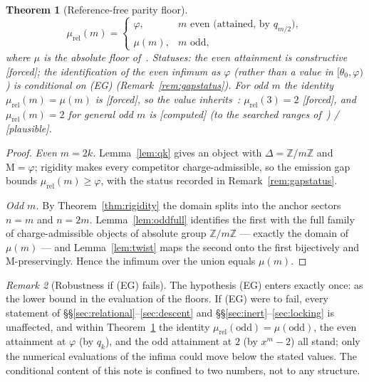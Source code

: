 \documentclass[11pt]{article}
\theoremstyle{plain}
\newtheorem{theorem}{Theorem}[section]
\theoremstyle{definition}
\theoremstyle{remark}
\newtheorem{remark}[theorem]{Remark}
\newcommand{\Z}{\mathbb{Z}}
\newcommand{\Mah}{\mathrm{M}}
\newcommand{\F}{\textnormal{[forced]}}
\newcommand{\C}{\textnormal{[computed]}}
\newcommand{\Pl}{\textnormal{[plausible]}}
\begin{document}
\begin{theorem}[Reference-free parity floor]\label{thm:parityrel}
\[
\mu_{\mathrm{rel}}(m)=
\begin{cases}
\varphi, & m\text{ even (attained, by }q_{m/2}\text{)},\\[2pt]
\mu(m), & m\text{ odd,}
\end{cases}
\]
where $\mu$ is the absolute floor of~\cite[Thm.~5.1]{CMC}. Statuses: the even
attainment is constructive \F; the identification of the even infimum as
$\varphi$ (rather than a value in $[\theta_0,\varphi)$) is conditional on
\textup{(EG)} (Remark~\ref{rem:gapstatus}). For odd
$m$ the identity
$\mu_{\mathrm{rel}}(m)=\mu(m)$ is \F, so the value inherits~\cite{CMC}:
$\mu_{\mathrm{rel}}(3)=2$ \F, and $\mu_{\mathrm{rel}}(m)=2$ for general odd $m$
is \C{} (to the searched ranges of~\cite[\S6]{CMC}) / \Pl.
\end{theorem}

\begin{proof}
\emph{Even $m=2k$.} Lemma~\ref{lem:qk} gives an object with $\Delta=\Z/m\Z$ and
$\Mah=\varphi$; rigidity makes every competitor charge-admissible, so the
emission gap bounds $\mu_{\mathrm{rel}}(m)\ge\varphi$, with the status
recorded in Remark~\ref{rem:gapstatus}.

\emph{Odd $m$.} By Theorem~\ref{thm:rigidity} the domain splits into the anchor
sectors $n=m$ and $n=2m$. Lemma~\ref{lem:oddfull} identifies the first with the
full family of charge-admissible objects of absolute group $\Z/m\Z$ --- exactly
the domain of $\mu(m)$ --- and Lemma~\ref{lem:twist} maps the second onto the
first bijectively and $\Mah$-preservingly. Hence the infimum over the union
equals $\mu(m)$.
\end{proof}

\begin{remark}[Robustness if \textup{(EG)} fails]\label{rem:robust}
The hypothesis \textup{(EG)} enters exactly once: as the lower bound in the
evaluation of the floors. If \textup{(EG)} were to fail, every statement of
\S\S\ref{sec:relational}--\ref{sec:descent} and
\S\S\ref{sec:inert}--\ref{sec:locking} is unaffected, and within
Theorem~\ref{thm:parityrel} the identity
$\mu_{\mathrm{rel}}(\text{odd})=\mu(\text{odd})$, the even attainment at
$\varphi$ (by $q_k$), and the odd attainment at $2$ (by $x^m-2$) all stand;
only the numerical evaluations of the infima could move below the stated
values. The conditional content of this note is confined to two numbers, not
to any structure.
\end{remark}
\end{document}
